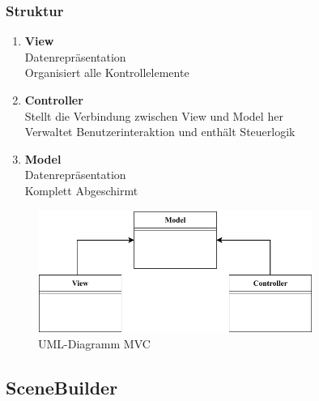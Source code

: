\subsubsection{Struktur}

\begin{enumerate}
    \item \textbf{View}  \\
    Datenrepräsentation\\
    Organisiert alle Kontrollelemente
    \item \textbf{Controller} \\
    Stellt die Verbindung zwischen View und Model her\\
    Verwaltet Benutzerinteraktion und enthält Steuerlogik
    \item \textbf{Model} \\
    Datenrepräsentation\\
    Komplett Abgeschirmt
\end{enumerate}
\begin{figure}[htb!]
    \centering
    \includegraphics[width=0.8\textwidth]{fig/ainf/ModelViewController.pdf}
    \caption{UML-Diagramm MVC}
    \label{fig:UML-Diagramm MVC}
\end{figure}
\subsection{SceneBuilder}\label{subsec:scenebuilder}

